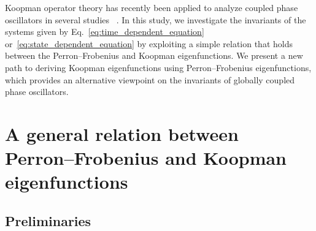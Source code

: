 \documentclass[
amsmath,amssymb,
]{revtex4-2}
\begin{document}
Koopman operator theory has recently been applied to analyze coupled phase oscillators
in several studies
~\cite{susuki2016power,hu2020synchronization,wang2021probing,mihara2022basin,thibeault2025kuramoto}. 
%
In this study, we investigate the invariants of the systems given by Eq.~\eqref{eq:time_dependent_equation} or~\eqref{eq:state_dependent_equation}
by exploiting a simple relation that holds between the Perron--Frobenius and Koopman eigenfunctions.
%
We present a new path to deriving Koopman eigenfunctions using Perron--Frobenius eigenfunctions, which provides 
an alternative viewpoint on the invariants of globally coupled phase oscillators.
%

\section{A general relation between Perron--Frobenius and Koopman eigenfunctions}
\subsection{Preliminaries}
\end{document}
